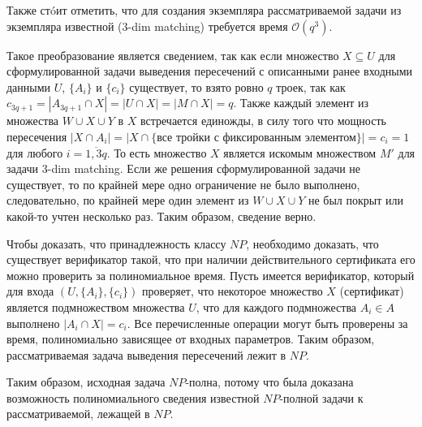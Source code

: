\documentclass[10pt]{article}
\begin{document}
Также ст\'{o}ит отметить, что для создания экземпляра рассматриваемой задачи из экземпляра известной (3-dim matching) требуется время $\mathcal{O}(q^3)$.
\medskip\par 
Такое преобразование является сведением, так как если множество $X\subseteq U$ для сформулированной задачи выведения пересечений с описанными ранее входными данными $U$, $\{A_i\}$ и $\{c_i\}$ существует, то взято ровно $q$ троек, так как $c_{3q+1}=|A_{3q+1}\cap X|= |U\cap X| = |M \cap X| = q$. Также каждый элемент из множества $W\cup X\cup Y$ в $X$ встречается единожды, в силу того что мощность пересечения $|X \cap A_i| = |X \cap \{\text{все тройки с фиксированным элементом}\}| = c_i = 1$ для любого $i=\overline{1,3q}$. То есть множество $X$ является искомым множеством $M'$ для задачи 3-dim matching. Если же решения сформулированной задачи не существует, то по крайней мере одно ограничение не было выполнено, следовательно, по крайней мере один элемент из $W\cup X\cup Y$ не был покрыт или какой-то учтен несколько раз. Таким образом, сведение верно.
\medskip\par 
Чтобы доказать, что принадлежность классу $NP$, необходимо доказать, что существует
верификатор такой, что при наличии действительного сертификата его можно проверить
за полиномиальное время. Пусть имеется верификатор, который для входа $(U, \{A_i\},\{c_i\})$ проверяет, что некоторое множество $X$ (сертификат) является подмножеством множества $U$, что для каждого подмножества $A_i \in A$ выполнено $|A_i\cap X| = c_i$. Все перечисленные операции могут быть проверены за время, полиномиально зависящее от входных параметров. Таким образом, рассматриваемая задача выведения пересечений лежит в $NP$.
\medskip\par 
Таким образом, исходная задача $NP$-полна, потому что была доказана возможность полиномиального сведения известной $NP$-полной задачи к рассматриваемой, лежащей в $NP$. 
\ \\[0.2 cm]
\hline
\end{document}

